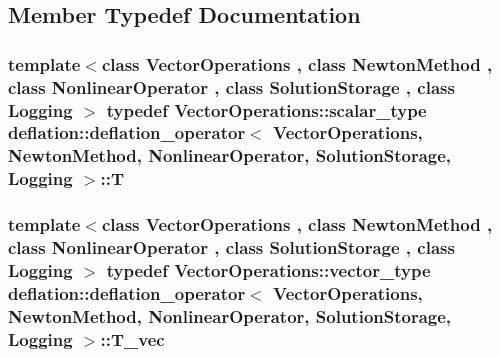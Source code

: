 \subsection{Member Typedef Documentation}
\hypertarget{classdeflation_1_1deflation__operator_a16b4c1329afeb50d9477f1094df943b9}{
\subsubsection[{T}]{\setlength{\rightskip}{0pt plus 5cm}template$<$class Vector\-Operations , class Newton\-Method , class Nonlinear\-Operator , class Solution\-Storage , class Logging $>$ typedef Vector\-Operations\-::scalar\-\_\-type {\bf deflation\-::deflation\-\_\-operator}$<$ Vector\-Operations, Newton\-Method, Nonlinear\-Operator, Solution\-Storage, Logging $>$\-::{\bf T}}}\label{classdeflation_1_1deflation__operator_a16b4c1329afeb50d9477f1094df943b9}
\hypertarget{classdeflation_1_1deflation__operator_ac7800761f41ffb590968f434afd25985}{
\subsubsection[{T\-\_\-vec}]{\setlength{\rightskip}{0pt plus 5cm}template$<$class Vector\-Operations , class Newton\-Method , class Nonlinear\-Operator , class Solution\-Storage , class Logging $>$ typedef Vector\-Operations\-::vector\-\_\-type {\bf deflation\-::deflation\-\_\-operator}$<$ Vector\-Operations, Newton\-Method, Nonlinear\-Operator, Solution\-Storage, Logging $>$\-::{\bf T\-\_\-vec}}}\label{classdeflation_1_1deflation__operator_ac7800761f41ffb590968f434afd25985}


